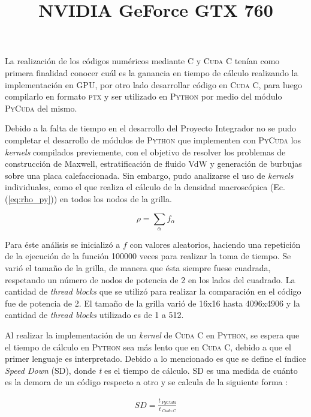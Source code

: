 La realización de los códigos numéricos mediante \textsc{C} y \textsc{Cuda C} tenían como primera finalidad conocer cuál es la ganancia en tiempo de cálculo realizando la implementación en GPU, por otro lado desarrollar código en \textsc{Cuda C}, para luego compilarlo en formato \textsc{ptx} y ser utilizado en \textsc{Python} por medio del módulo \textsc{PyCuda} del mismo.

Debido a la falta de tiempo en el desarrollo del Proyecto Integrador no se pudo completar el desarrollo de módulos de \textsc{Python} que implementen con \textsc{PyCuda} los \textit{kernels} compilados previemente, con el objetivo de resolver los problemas de construcción de Maxwell, estratificación de fluido VdW y generación de burbujas sobre una placa calefaccionada.  Sin embargo, pudo analizarse el uso de \textit{kernels} individuales, como el que realiza el cálculo de la densidad macroscópica (Ec.(\ref{eq:rho_py})) en todos los nodos de la grilla.

\begin{equation}
\rho = \sum_{\alpha} f_{\alpha}
\label{eq:rho_py}
\end{equation}

Para éste análisis se inicializó a $f$ con valores aleatorios, haciendo una repetición de la ejecución de la función 100000 veces para realizar la toma de tiempo. Se varió el tamaño de la grilla, de manera que ésta siempre fuese cuadrada, respetando un número de nodos de potencia de 2 en los lados del cuadrado. La cantidad de \textit{thread blocks} que se utilizó para realizar la comparación en el código fue de potencia de 2. El tamaño de la grilla varió de 16x16 hasta 4096x4906 y la cantidad de \textit{thread blocks} utilizado es de 1 a 512.

Al  realizar la implementación de un \textit{kernel} de \textsc{Cuda C} en \textsc{Python}, se espera que el tiempo de cálculo en \textsc{Python} sea más lento que en \textsc{Cuda C}, debido a que el primer lenguaje es interpretado. Debido a lo mencionado es que se define el índice \textit{Speed Down} (SD), donde \textit{t} es el tiempo de cálculo. SD es una medida de cuánto es la demora de un código respecto a otro y se calcula de la siguiente forma :

\begin{align}
SD = \frac{t_{\>PyCuda}}{t_{\>Cuda \> C}} 
\end{align} 

\newpage

\title{\textbf{NVIDIA GeForce GTX 760}}
\newline

